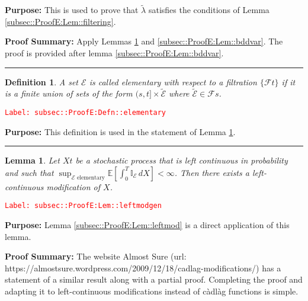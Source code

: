 \documentclass[12pt]{article}
\newcommand{\mb}{\mathbb}
\newcommand{\mc}{\mathcal}
\newcommand{\te}{\text}
\newcommand{\tr}{\textcolor{red}}
\newcommand{\labe}[1]{\tr{\texttt{Label: #1}}}
\newcommand{\purpose}{\textbf{Purpose: }}
\newcommand{\pfsum}{\textbf{Proof Summary: }}
\newcommand{\lin}{\rule{\linewidth}{0.4 pt}}
\newcommand{\ex}[1]{\mb{E}\left[#1\right]}			%
\newcommand{\T}{T}								%
\renewcommand{\t}{t}							%
\renewcommand{\tt}{s}							%
\newcommand{\F}{\mc{F}}							%
\newcommand{\X}{X}								%
\newcommand{\alt}[1]{\widetilde{#1}}			%
\newcommand{\evnt}{\mc{E}}						%
\newcommand{\crate}{\alt{\lambda}}				%
\newtheorem{lem}[thms]{Lemma}
\newtheorem{defn}[thms]{Definition}
\begin{document}
\purpose This is used to prove that \(\crate{}{}\) satisfies the conditions of Lemma \ref{subsec::ProofE:Lem::filtering}.

\pfsum Apply Lemmas \ref{subsec::ProofE:Lem::leftmodgen} and \ref{subsec::ProofE:Lem::bddvar}. The proof is provided after lemma \ref{subsec::ProofE:Lem::bddvar}.

\lin

\begin{defn}
A set \(\evnt{}\) is called elementary with respect to a filtration \(\{\F{}{\t}\}\) if it is a finite union of sets of the form \((\tt,\t]\times \alt{\evnt}\) where \(\alt{\evnt} \in \F{}{\tt}\).
\label{subsec::ProofE:Defn::elementary}
\end{defn}
\labe{subsec::ProofE:Defn::elementary}

\purpose This definition is used in the statement of Lemma \ref{subsec::ProofE:Lem::leftmodgen}.

\lin

\begin{lem}
Let \(\X{}{\t}\) be a stochastic process that is left continuous in probability and such that \(\sup_{\evnt{}\te{ elementary}}\ex{\int_0^\T \mb{I}_\evnt{}\,d\X{}{}} < \infty\). Then there exists a left-continuous modification of \(\X{}{}\).
\label{subsec::ProofE:Lem::leftmodgen}
\end{lem}
\labe{subsec::ProofE:Lem::leftmodgen}

\purpose Lemma \ref{subsec::ProofE:Lem::leftmod} is a direct application of this lemma.

\pfsum The website Almost Sure (url: https://almostsure.wordpress.com/2009/12/18/cadlag-modifications/) has a statement of a similar result along with a partial proof. Completing the proof and adapting it to left-continuous modifications instead of c\`adl\`ag functions is simple.
\end{document}
